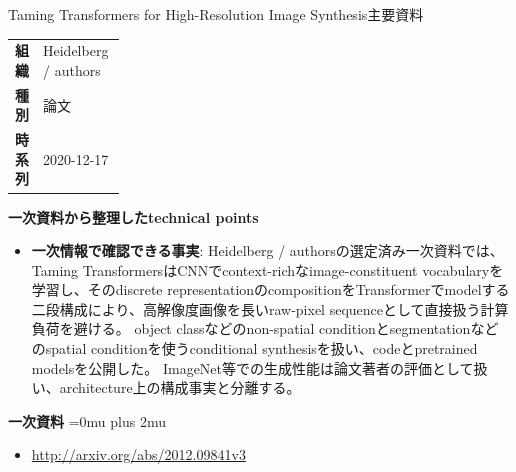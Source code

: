 \begin{technicalnote}{Taming Transformers for High-Resolution Image Synthesis}{主要資料}
\begingroup
\begin{tabularx}{\linewidth}{@{}>{\bfseries}p{0.22\linewidth}X@{}}
組織 & Heidelberg / authors \\
種別 & 論文 \\
時系列 & 2020-12-17 \\
\end{tabularx}
\smallskip
{\bfseries 一次資料から整理したtechnical points}
\begin{itemize}[leftmargin=1.5em,itemsep=0.35em]
\item \textbf{一次情報で確認できる事実}: Heidelberg / authorsの選定済み一次資料では、Taming TransformersはCNNでcontext-richなimage-constituent vocabularyを学習し、そのdiscrete representationのcompositionをTransformerでmodelする二段構成により、高解像度画像を長いraw-pixel sequenceとして直接扱う計算負荷を避ける。 object classなどのnon-spatial conditionとsegmentationなどのspatial conditionを使うconditional synthesisを扱い、codeとpretrained modelsを公開した。 ImageNet等での生成性能は論文著者の評価として扱い、architecture上の構成事実と分離する。
\end{itemize}
\begin{minipage}{\linewidth}
\begin{samepage}
{\bfseries 一次資料}
\begingroup\sloppy
\Urlmuskip=0mu plus 2mu\relax
\begin{itemize}[leftmargin=1.5em,itemsep=0.25em]
\item {\scriptsize\url{http://arxiv.org/abs/2012.09841v3}}
\end{itemize}
\endgroup
\end{samepage}
\end{minipage}
\endgroup
\end{technicalnote}
\medskip
